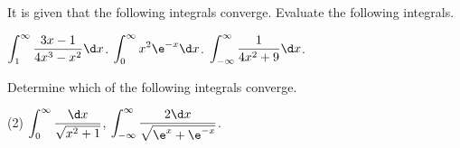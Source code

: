\begin{problem}
    It is given that the following integrals converge. Evaluate the following integrals.
    \begin{tasks}
        \task $\displaystyle\int_1^\infty \frac{3x-1}{4x^3 - x^2} \d x$.
        \task $\displaystyle\int_0^\infty x^2 \e^{-x} \d x$.
        \task $\displaystyle\int_{-\infty}^{\infty} \frac1{4x^2 + 9} \d x$.
    \end{tasks}
\end{problem}

\begin{problem}
    Determine which of the following integrals converge.

    \begin{tasks}(2)
        \task $\displaystyle\int_0^\infty \frac{\d x}{\sqrt{x^2 + 1}}$,
        \task $\displaystyle\int_{-\infty}^\infty \frac{2 \d x}{\sqrt{\e^x + \e^{-x}}}$.
    \end{tasks}
\end{problem}